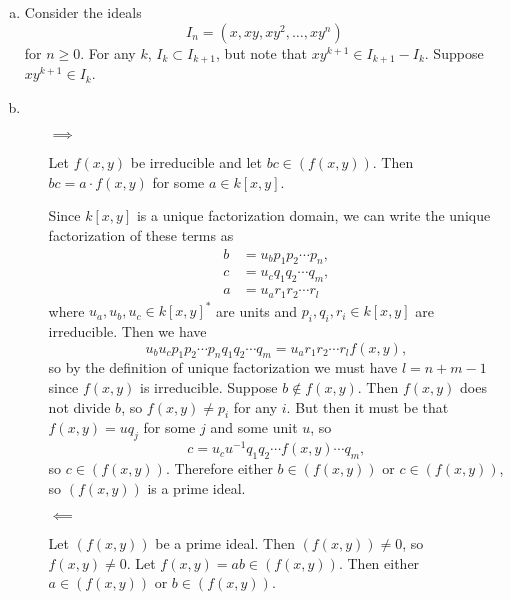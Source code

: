 \documentclass{article}
\begin{document}
\begin{Answer}
  \begin{enumerate}[(a)]
    \item{
      Consider the ideals
      $$
      I_n = (x, xy, xy^2, \dots, xy^n)
      $$
      for $n \geq 0$. For any $k$, $I_k \subset I_{k+1}$, but note that
      $xy^{k+1} \in I_{k+1} - I_k$. Suppose $xy^{k+1} \in I_k$.
    }
    \item{
      \begin{itemize}
        \item[$\implies$]{
          Let $f(x,y)$ be irreducible and let $bc \in (f(x,y))$. Then
          $bc = a \cdot f(x,y)$ for some $a \in k[x,y]$.

          Since $k[x,y]$ is a unique factorization domain, we can
          write the unique factorization of these terms as
          \begin{align*}
            b &= u_b p_1 p_2 \cdots p_n, \\
            c &= u_c q_1 q_2 \cdots q_m, \\
            a &= u_a r_1 r_2 \cdots r_l
          \end{align*}
          where $u_a, u_b, u_c \in k[x,y]^\ast$ are units and
          $p_i, q_i, r_i \in k[x,y]$ are irreducible. Then we have
          $$
            u_b u_c p_1 p_2 \cdots p_n q_1 q_2 \cdots q_m
          = u_a r_1 r_2 \cdots r_l f(x,y),
          $$
          so by the definition of unique factorization we must have
          $l =  n + m - 1$ since $f(x,y)$ is irreducible.
          Suppose $b \notin f(x,y)$. Then $f(x,y)$ does not divide
          $b$, so $f(x,y) \neq p_i$ for any $i$. But then it must be
          that $f(x,y) = u q_j$ for some $j$ and some unit $u$, so
          $$
          c = u_c u^{-1} q_1 q_2 \cdots f(x,y) \cdots q_m,
          $$
          so $c \in (f(x,y))$. Therefore either
          $b \in (f(x,y))$ or $c \in (f(x,y))$,
          so $(f(x,y))$ is a prime ideal.
        }
        \item[$\impliedby$]{
          Let $(f(x,y))$ be a prime ideal. Then $(f(x,y)) \neq 0$, so
          $f(x,y) \neq 0$. Let $f(x,y) = ab \in (f(x,y))$.
          Then either $a \in (f(x,y))$ or $b \in (f(x,y))$.

}
\end{itemize}}
\end{enumerate}
\end{Answer}
\end{document}

